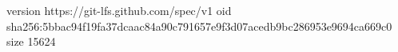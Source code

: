 version https://git-lfs.github.com/spec/v1
oid sha256:5bbac94f19fa37dcaac84a90c791657e9f3d07acedb9bc286953e9694ca669c0
size 15624
